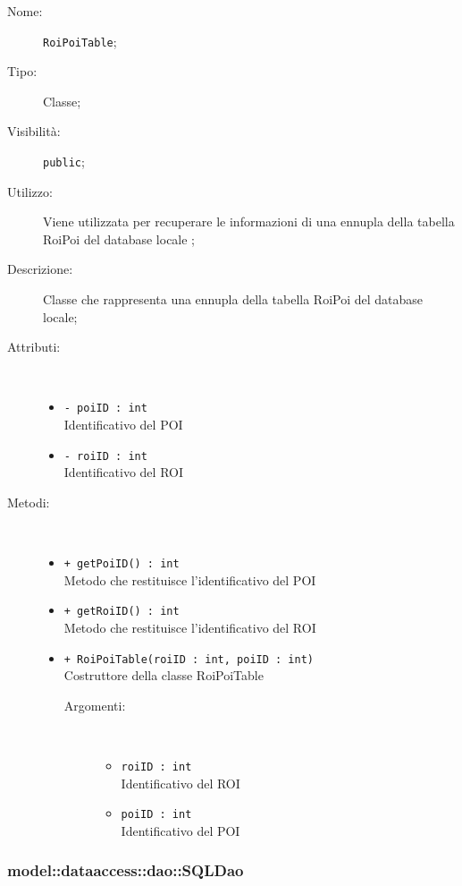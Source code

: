 \documentclass[../DefinizioneDiProdotto.tex]{subfiles}
\begin{document}
    \begin{description}
\item[Nome:] \texttt{RoiPoiTable};
\item[Tipo:] Classe;
\item[Visibilità:] \texttt{public};
\item[Utilizzo:] Viene utilizzata per recuperare le informazioni di una ennupla della tabella RoiPoi del database locale ;
\item[Descrizione:] Classe che rappresenta una ennupla della tabella RoiPoi del database locale;
\item[Attributi:] \
\begin{itemize}
\item \texttt{- poiID : int}\\
Identificativo del POI

\item \texttt{- roiID : int}\\
Identificativo del ROI

\end{itemize}
\item[Metodi:] \
\begin{itemize}
\item \texttt{+ getPoiID() : int}\\
Metodo che restituisce l'identificativo del POI
 \item \texttt{+ getRoiID() : int}\\
Metodo che restituisce l'identificativo del ROI
 \item \texttt{+ RoiPoiTable(roiID : int, poiID : int)}\\
Costruttore della classe RoiPoiTable
 \begin{description}
\item[Argomenti:] \
\begin{itemize}
\item \texttt{roiID : int}\\
Identificativo del ROI\item \texttt{poiID : int}\\
Identificativo del POI\end{itemize}
\end{description}
\end{itemize}
\end{description}

\subsubsection{model::dataaccess::dao::SQLDao}
\end{document}
